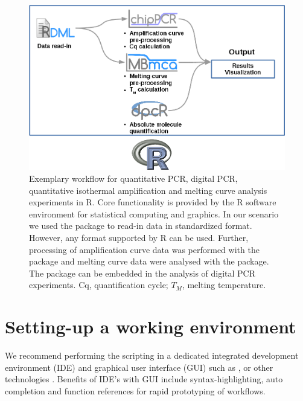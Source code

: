 \begin{figure}[htbp]
  \centering
  \includegraphics{figures/workflow.png}
  \caption{Exemplary workflow for quantitative PCR, digital PCR, quantitative 
isothermal amplification and melting curve analysis experiments in R. Core 
functionality is provided by the R software environment for statistical 
computing and graphics. In our scenario we used the  package to 
read-in data in standardized format. However, any format supported by R can be 
used. Further, processing of amplification curve data was performed with the 
 package and melting curve data were analysed with the 
 package. The  package can be embedded in the 
analysis of digital PCR experiments. Cq, quantification cycle; $T_{M}$, melting 
temperature. 
} 
\label{figure:workflow}
\end{figure}

\section{Setting-up a working environment}

We recommend performing the scripting in a dedicated integrated development 
environment (IDE) and graphical user interface (GUI) such as  
\citep{rodiger_rkward_2012},  \citep{RStudio, gandrud_2013} or 
other technologies \citep{Valero_2012}. Benefits of IDE's with GUI include 
syntax-highlighting, auto completion and function references for rapid 
prototyping of workflows.

